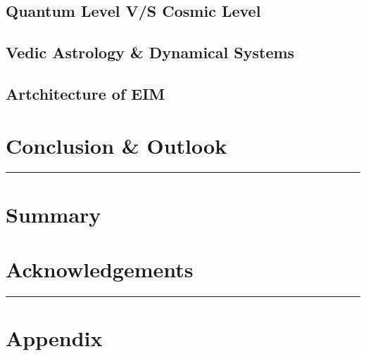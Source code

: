 \documentclass{IEEEtran}
\begin{document}
\begin{multicols}{2}
		\subsection{Quantum Level V/S Cosmic Level}
		
		\subsection{Vedic Astrology \& Dynamical Systems}
		
		\subsection{Artchitecture of EIM}
		
		\section{Conclusion \& Outlook}
		
	\end{multicols}
	\hrule
	\centering
	\section*{Summary}
	
	\section*{Acknowledgements}
	
	\newline
	\hrule
	
	
	\appendix
	\section*{Appendix}
	
\end{document}
